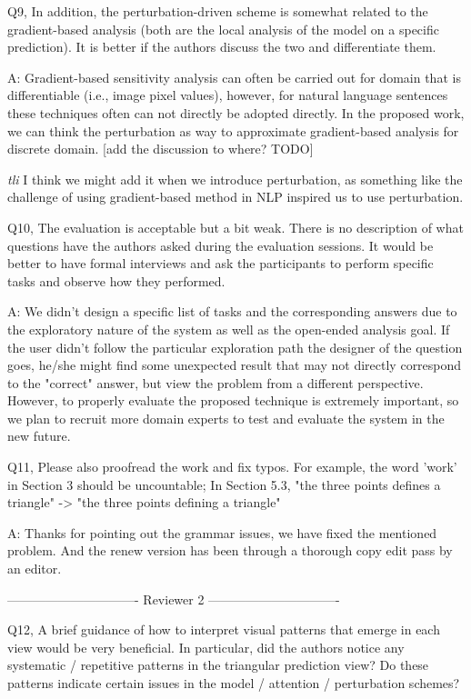 Q9, In addition, the perturbation-driven scheme is somewhat related to the gradient-based analysis (both are the local analysis of the model on a specific prediction). It is better if the authors discuss the two and differentiate them.

A: Gradient-based sensitivity analysis can often be carried out for domain that is differentiable (i.e., image pixel values), however, for natural language sentences these techniques often can not directly be adopted directly. In the proposed work, we can think the perturbation as way to approximate gradient-based analysis for discrete domain. [add the discussion to where? TODO]

\emph{tli} I think we might add it when we introduce perturbation, as something like the challenge of using gradient-based method in NLP inspired us to use perturbation.

Q10, The evaluation is acceptable but a bit weak. There is no description of what questions have the authors asked during the evaluation sessions. It would be better to have formal interviews and ask the participants to perform specific tasks and observe how they performed.

A: We didn't design a specific list of tasks and the corresponding answers due to the exploratory nature of the system as well as the open-ended analysis goal. If the user didn't follow the particular exploration path the designer of the question goes, he/she might find some unexpected result that may not directly correspond to the "correct" answer, but view the problem from a different perspective. However, to properly evaluate the proposed technique is extremely important, so we plan to recruit more domain experts to test and evaluate the system in the new future.

Q11, Please also proofread the work and fix typos. For example, the word 'work' in Section 3 should be uncountable; In Section 5.3, "the three points defines a triangle" -> "the three points defining a triangle"

A: Thanks for pointing out the grammar issues, we have fixed the mentioned problem. And the renew version has been through a thorough copy edit pass by an editor.

------------------------------- Reviewer 2 -------------------------------

Q12, A brief guidance of how to interpret visual patterns that emerge in each view would be very beneficial. In particular, did the authors notice any systematic / repetitive patterns in the triangular prediction view? Do these patterns indicate certain issues in the model / attention / perturbation schemes?

